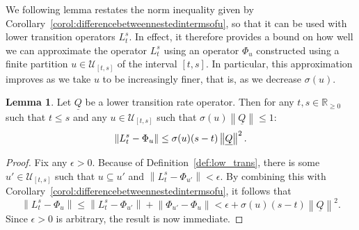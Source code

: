 \documentclass[10pt,a4paper]{paper}
\theoremstyle{definition}
\newtheorem{lemma}[theorem]{Lemma}
\newcommand{\reals}{\mathbb{R}}
\newcommand{\realsnonneg}{\reals_{\geq 0}}
\newcommand{\lrate}{\underline{Q}}
\newcommand{\norm}[1]{\left\lVert #1 \right\rVert}
\begin{document}
We following lemma restates the norm inequality given by Corollary~\ref{corol:differencebetweennestedintermsofu}, so that it can be used with lower transition operators $L_t^s$. In effect, it therefore provides a bound on how well we can approximate the operator $L_t^s$ using an operator $\Phi_u$ constructed using a finite partition $u\in\mathcal{U}_{[t,s]}$ of the interval $[t,s]$. In particular, this approximation improves as we take $u$ to be increasingly finer, that is, as we decrease $\sigma(u)$.

\begin{lemma}\label{lemma:limitboundonL}
Let $\lrate$ be a lower transition rate operator. Then for any $t,s\in\realsnonneg$ such that $t\leq s$ and any $u\in\mathcal{U}_{[t,s]}$ such that $\sigma(u)\norm{\lrate}\leq 1$:
\begin{equation*}
\norm{L_t^s-\Phi_{u}}\leq\sigma(u)(s-t)\norm{\lrate}^2.\vspace{5pt}
\end{equation*}
\end{lemma}
\begin{proof}
Fix any $\epsilon>0$. Because of Definition~\ref{def:low_trans}, there is some $u'\in\mathcal{U}_{[t,s]}$ such that $u\subseteq u'$ and $\norm{L_t^s-\Phi_{u'}}<\epsilon$. By combining this with Corollary~\ref{corol:differencebetweennestedintermsofu}, it follows that
\begin{equation*}
\norm{L_t^s-\Phi_{u}}
\leq
\norm{L_t^s-\Phi_{u'}}
+
\norm{\Phi_{u'}-\Phi_{u}}
<\epsilon+
\sigma(u)(s-t)\norm{\lrate}^2.
\end{equation*}
Since $\epsilon>0$ is arbitrary, the result is now immediate.
\end{proof}
\end{document}
